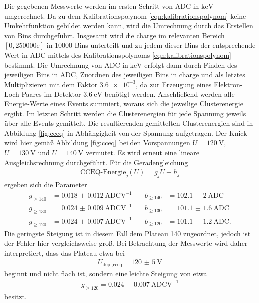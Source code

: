 Die gegebenen Messwerte werden im ersten Schritt von ADC in $\si{\kilo\electronvolt}$ umgerechnet.
Da zu dem Kalibrationspolynom \eqref{eqn:kalibrationspolynom} keine Umkehrfunktion gebildet werden kann,
wird die Umrechnung durch das Erstellen von Bins durchgeführt. Insgesamt wird die charge im relevanten Bereich
$[0,250000\mathrm{e}]$ in 10000 Bins unterteilt und zu jedem dieser Bins der entsprechende Wert in ADC mittels
des Kalibrationspolynoms \eqref{eqn:kalibrationspolynom} bestimmt. Die Umrechnung von ADC in $\si{\kilo\electronvolt}$
erfolgt dann durch Finden des jeweiligen Bins in ADC, Zuordnen des jeweiligen Bins in charge und als letztes Multiplizieren
mit dem Faktor $\num{3.6e-3}$, da zur Erzeugung eines Elektron-Loch-Paares im Detektor $\SI{3.6}{\electronvolt}$
benötigt werden. Anschließend werden alle Energie-Werte eines Events summiert, woraus sich die jeweilige Clusterenergie ergibt.
Im letzten Schritt werden die Clusterenergien für jede Spannung jeweils über alle Events gemittelt. Die resultierenden
gemittelten Clusterenergien sind in Abbildung \ref{fig:cceq} in Abhängigkeit von der Spannung aufgetragen.
Der Knick wird hier gemäß Abbildung \ref{fig:cceq} bei den Vorspannungen $U = \SI{120}{\volt}$, $U = \SI{130}{\volt}$ und
$U = \SI{140}{\volt}$ vermutet. Es wird erneut eine lineare Ausgleichsrechnung durchgeführt.
Für die Geradengleichung
\begin{align}
  \text{CCEQ-Energie}_j(U) = g_j U + h_j
\end{align}
ergeben sich die Parameter
\begin{align*}
  g_{\geq140} &= \SI{0.018(12)}{\text{ADC}\volt\tothe{-1}} &\quad b_{\geq140} &= \SI{102.1(20)}{\text{ADC}} \\
  g_{\geq130} &=  \SI{0.024(9)}{\text{ADC}\volt\tothe{-1}} &\quad b_{\geq130} &= \SI{101.1(16)}{\text{ADC}} \\
  g_{\geq120} &=  \SI{0.024(7)}{\text{ADC}\volt\tothe{-1}} &\quad b_{\geq120} &= \SI{101.1(12)}{\text{ADC}}.
\end{align*}
Die geringste Steigung ist in diesem Fall dem Plateau 140 zugeordnet, jedoch ist der Fehler hier vergleichsweise groß.
Bei Betrachtung der Messwerte wird daher interpretiert, dass das Plateau etwa bei
\begin{align}
  U_\text{depl,cceq} = \SI{120(5)}{\volt}
\end{align}
beginnt und nicht flach ist, sondern eine leichte Steigung von etwa
\begin{align}
  g_{\geq120} =  \SI{0.024(7)}{\text{ADC}\volt\tothe{-1}}
\end{align}
besitzt.

